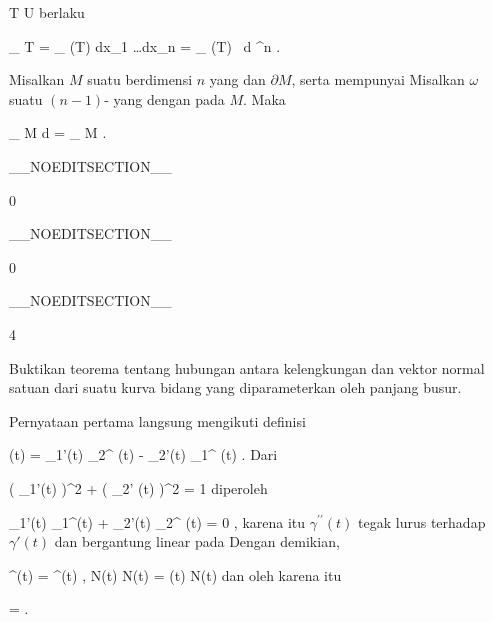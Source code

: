 {{\mavergleichskette
{\vergleichskette
{ T
}
{ \subseteq }{ U
}
{  }{
}
{    }{
}
{   }{
}
}
{}{}{}
berlaku

\mavergleichskettedisp
{\vergleichskette
{
\int_{  T   }  \omega
}
{ =} {
\int_{ \alpha(T)  }    dx_1 \wedge \ldots \wedge dx_n
}
{ =} { \int_{ \alpha(T)  }       \,  d \lambda^n
}
{ } {
}
{ } {
}
}
{}{}{.}}{Misalkan $M$ suatu
berdimensi $n$ yang
dan
$\partial M$, serta mempunyai
Misalkan $\omega$ suatu
$(n-1)$-
yang
dengan
 pada $M$. Maka

\mavergleichskettedisp
{\vergleichskette
{
\int_{ M  }  d\omega
}
{ =} {
\int_{ \partial M  }  \omega
}
{ } {
}
{ } {
}
{ } {
}
}
{}{}{.}}

 }

__NOEDITSECTION__

{0}

{

}
{  }

__NOEDITSECTION__

{0}

{

}
{  }

__NOEDITSECTION__

{4}

{

Buktikan teorema tentang hubungan antara kelengkungan dan vektor normal satuan dari suatu kurva bidang yang diparameterkan oleh panjang busur.

}
{

Pernyataan pertama langsung mengikuti definisi

\mavergleichskettedisp
{\vergleichskette
{ \kappa(t)
}
{ =} { \gamma_1'(t) \gamma_2^{\prime \prime} (t) - \gamma_2'(t) \gamma_1^{\prime \prime} (t)
}
{ } {
}
{ } {
}
{ } {
}
}
{}{}{.}
Dari

\mavergleichskettedisp
{\vergleichskette
{ \left(  \gamma_1'(t)  \right)^2 +  \left(  \gamma_2' (t)  \right)^2
}
{ =} { 1
}
{ } {
}
{ } {
}
{ } {
}
}
{}{}{}
diperoleh

\mavergleichskettedisp
{\vergleichskette
{ \gamma_1'(t) \gamma_1^{\prime \prime}(t) + \gamma_2'(t) \gamma_2^{\prime \prime} (t)
}
{ =} { 0
}
{ } {
}
{ } {
}
{ } {
}
}
{}{}{,}
karena itu $\gamma^{\prime \prime}(t)$ tegak lurus terhadap $\gamma'(t)$ dan bergantung linear pada
 Dengan demikian,

\mavergleichskettedisp
{\vergleichskette
{ \gamma^{\prime \prime}(t)
}
{ =} { \left\langle  \gamma^{\prime \prime}(t) ,  N(t)  \right\rangle  N(t)
}
{ =} { \kappa(t) N(t)
}
{ } {
}
{ } {
}
}
{}{}{}
dan oleh karena itu

\mavergleichskettedisp
{\vergleichskette
{  \Vert
}
{ =} { 
}
{ } {
}
{ } {
}
{ } {
}
}
{}{}{.}

 }

